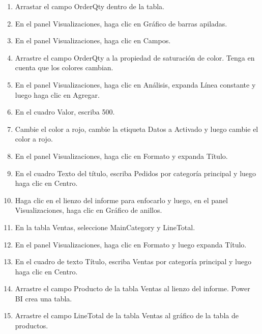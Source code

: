 \begin{enumerate}
    \item Arrastar el campo OrderQty dentro de la tabla.


    \item En el panel Visualizaciones, haga clic en Gráfico de barras apiladas.
    
    \item En el panel Visualizaciones, haga clic en Campos.
    \item Arrastre el campo OrderQty a la propiedad de saturación de color. Tenga en cuenta que los colores cambian.
    
    \item En el panel Visualizaciones, haga clic en Análisis, expanda Línea constante y luego haga clic en Agregar.

    \item En el cuadro Valor, escriba 500.
    
    
    
    
    \item Cambie el color a rojo, cambie la etiqueta Datos a Activado y luego cambie el color a rojo.
    
    \item En el panel Visualizaciones, haga clic en Formato y expanda Título.
    
    \item En el cuadro Texto del título, escriba Pedidos por categoría principal y luego haga clic en Centro.

    \item Haga clic en el lienzo del informe para enfocarlo y luego, en el panel Visualizaciones, haga clic en Gráfico de anillos.
    
    \item En la tabla Ventas, seleccione MainCategory y LineTotal.
    \item En el panel Visualizaciones, haga clic en Formato y luego expanda Título.
    \item En el cuadro de texto Título, escriba Ventas por categoría principal y luego haga clic en Centro.


    \item Arrastre el campo Producto de la tabla Ventas al lienzo del informe. Power BI crea una tabla.
    \item Arrastre el campo LineTotal de la tabla Ventas al gráfico de la tabla de productos.
    
    
    
    
    
    
    

\end{enumerate}
